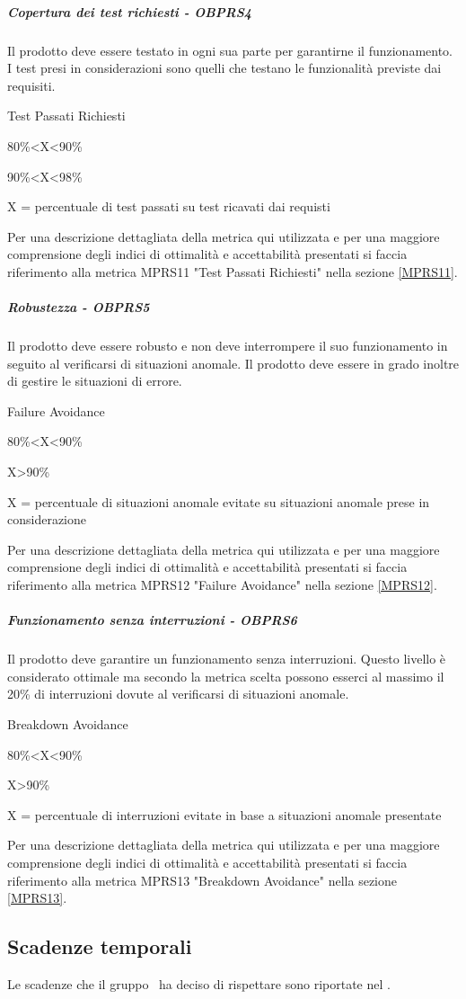 \documentclass[../PianoDiQualifica.tex]{subfiles}
\begin{document}
				\subparagraph{Copertura dei test richiesti - OBPRS4}
				Il prodotto deve essere testato in ogni sua parte per garantirne il funzionamento. I test presi in considerazioni sono quelli che testano le funzionalità previste dai requisiti. 
					\begin{description}
						\item [Metrica utilizzata:] Test Passati Richiesti
						\item [Soglia di accettabilità:] 80\%<X<90\%
						\item [Soglia di ottimalità:] 90\%<X<98\%
						\item X = percentuale di test passati su test ricavati dai requisti
					\end{description}
			    Per una descrizione dettagliata della metrica qui utilizzata e per una maggiore comprensione degli indici di ottimalità e accettabilità presentati si faccia riferimento alla metrica MPRS11 "Test Passati Richiesti" nella sezione \ref{MPRS11}.
				\subparagraph{Robustezza -  OBPRS5}	
				Il prodotto deve essere robusto e non deve interrompere il suo funzionamento in seguito al verificarsi di situazioni anomale. Il prodotto deve essere in grado inoltre di gestire le situazioni di errore.
					\begin{description}
						\item [Metrica utilizzata:] Failure Avoidance
						\item [Soglia di accettabilità:] 80\%<X<90\%
						\item [Soglia di ottimalità:] X>90\%
						\item X = percentuale di situazioni anomale evitate su situazioni anomale prese in considerazione
					\end{description}
					Per una descrizione dettagliata della metrica qui utilizzata e per una maggiore comprensione degli indici di ottimalità e accettabilità presentati si faccia riferimento alla metrica MPRS12 "Failure Avoidance" nella sezione \ref{MPRS12}.
				\subparagraph{Funzionamento senza interruzioni - OBPRS6}
					Il prodotto deve garantire un funzionamento senza interruzioni. Questo livello è considerato ottimale ma secondo la metrica scelta possono esserci al massimo il 20\% di interruzioni dovute al verificarsi di situazioni anomale.  
					\begin{description}
						\item [Metrica utilizzata:] Breakdown Avoidance
						\item [Soglia di accettabilità:] 80\%<X<90\%
						\item [Soglia di ottimalità:] X>90\%
						\item X = percentuale di interruzioni evitate in base a situazioni anomale presentate
					\end{description}
					Per una descrizione dettagliata della metrica qui utilizzata e per una maggiore comprensione degli indici di ottimalità e accettabilità presentati si faccia riferimento alla metrica MPRS13 "Breakdown Avoidance" nella sezione \ref{MPRS13}.
	\subsection{Scadenze temporali}
	Le scadenze che il gruppo \leaf\ ha deciso di rispettare sono riportate nel \pianodiprogettov.
\end{document}
